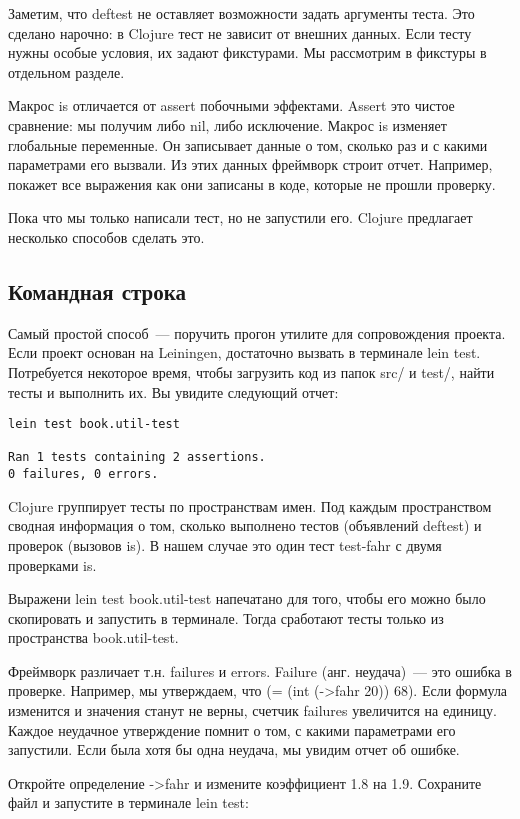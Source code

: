 Заметим, что deftest не оставляет возможности задать аргументы теста. Это
сделано нарочно: в Clojure тест не зависит от внешних данных. Если тесту нужны
особые условия, их задают фикстурами. Мы рассмотрим в фикстуры в отдельном
разделе.

Макрос is отличается от assert побочными эффектами. Assert это чистое сравнение:
мы получим либо nil, либо исключение. Макрос is изменяет глобальные
переменные. Он записывает данные о том, сколько раз и с какими параметрами его
вызвали. Из этих данных фреймворк строит отчет. Например, покажет все выражения
как они записаны в коде, которые не прошли проверку.

Пока что мы только написали тест, но не запустили его. Clojure предлагает
несколько способов сделать это.

\subsection{Командная строка}

Самый простой способ~--- поручить прогон утилите для сопровождения проекта. Если
проект основан на Leiningen, достаточно вызвать в терминале lein
test. Потребуется некоторое время, чтобы загрузить код из папок src/ и test/,
найти тесты и выполнить их. Вы увидите следующий отчет:

\begin{verbatim}
lein test book.util-test

Ran 1 tests containing 2 assertions.
0 failures, 0 errors.
\end{verbatim}

Clojure группирует тесты по пространствам имен. Под каждым пространством сводная
информация о том, сколько выполнено тестов (объявлений deftest) и проверок
(вызовов is). В нашем случае это один тест test-fahr с двумя проверками is.

Выражени lein test book.util-test напечатано для того, чтобы его можно было
скопировать и запустить в терминале. Тогда сработают тесты только из
пространства book.util-test.

Фреймворк различает т.н. failures и errors. Failure (анг. неудача)~--- это ошибка
в проверке. Например, мы утверждаем, что (= (int (->fahr 20)) 68). Если формула
изменится и значения станут не верны, счетчик failures увеличится на
единицу. Каждое неудачное утверждение помнит о том, с какими параметрами его
запустили. Если была хотя бы одна неудача, мы увидим отчет об ошибке.

Откройте определение ->fahr и измените коэффициент 1.8 на 1.9. Сохраните файл и
запустите в терминале lein test:

